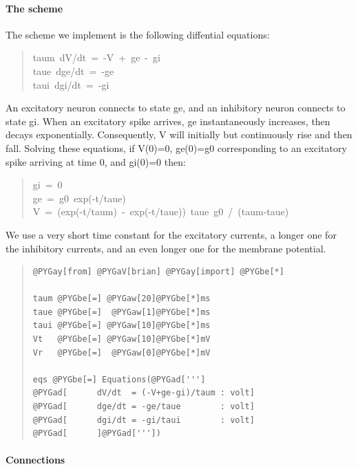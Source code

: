 \documentclass[letterpaper,10pt,english]{manual}
\begin{document}
\paragraph{The scheme}

The scheme we implement is the following diffential equations:
\begin{quote}
{\raggedright{}taum~dV/dt~=~-V~+~ge~-~gi\\
taue~dge/dt~=~-ge\\
taui~dgi/dt~=~-gi}
\end{quote}

An excitatory neuron connects to state ge, and an inhibitory neuron connects
to state gi. When an excitatory spike arrives, ge instantaneously increases,
then decays exponentially. Consequently, V will initially but continuously
rise and then fall. Solving these equations, if V(0)=0, ge(0)=g0 corresponding
to an excitatory spike arriving at time 0, and gi(0)=0 then:
\begin{quote}
{\raggedright{}gi~=~0\\
ge~=~g0~exp(-t/taue)\\
V~=~(exp(-t/taum)~-~exp(-t/taue))~taue~g0~/~(taum-taue)}
\end{quote}

We use a very short time constant for the excitatory currents, a longer one
for the inhibitory currents, and an even longer one for the membrane
potential.
\begin{quote}

\begin{Verbatim}[commandchars=@\[\]]
@PYGay[from] @PYGaV[brian] @PYGay[import] @PYGbe[*]

taum @PYGbe[=] @PYGaw[20]@PYGbe[*]ms
taue @PYGbe[=]  @PYGaw[1]@PYGbe[*]ms
taui @PYGbe[=] @PYGaw[10]@PYGbe[*]ms
Vt   @PYGbe[=] @PYGaw[10]@PYGbe[*]mV
Vr   @PYGbe[=]  @PYGaw[0]@PYGbe[*]mV

eqs @PYGbe[=] Equations(@PYGad[''']
@PYGad[      dV/dt  = (-V+ge-gi)/taum : volt]
@PYGad[      dge/dt = -ge/taue        : volt]
@PYGad[      dgi/dt = -gi/taui        : volt]
@PYGad[      ]@PYGad['''])
\end{Verbatim}
\end{quote}


\paragraph{Connections}
\end{document}
